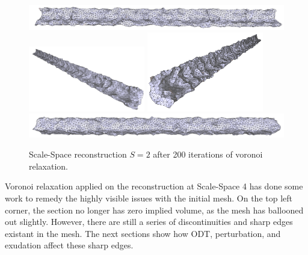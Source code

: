 \documentclass[12pt]{drexelthesis}
\begin{document}
\begin{figure}[!ht]	
	\centering
		\includegraphics[width=5in]{simulated-lab-scan/2cmnoise/optimizedNeat/scalespace2lloyd00.png}
		\includegraphics[width=2in]{simulated-lab-scan/2cmnoise/optimizedNeat/scalespace2lloyd01.png}
		\includegraphics[width=2in]{simulated-lab-scan/2cmnoise/optimizedNeat/scalespace2lloyd02.png}
		\includegraphics[width=5in]{simulated-lab-scan/2cmnoise/optimizedNeat/scalespace2lloyd03.png}
		\caption[Scale-Space reconstruction $S = 2$ after 200 iterations of voronoi relaxation]{\centering Scale-Space reconstruction $S = 2$ after 200 iterations of voronoi relaxation.}
	\label{2cmnoise:scalespace2lloyd}
\end{figure}

Voronoi relaxation applied on the reconstruction at Scale-Space 4 has done some work to remedy the highly visible issues with the initial mesh. On the top left corner, the section no longer has zero implied volume, as the mesh has ballooned out slightly. However, there are still a series of discontinuities and sharp edges existant in the mesh. The next sections show how ODT, perturbation, and exudation affect these sharp edges.
\end{document}
